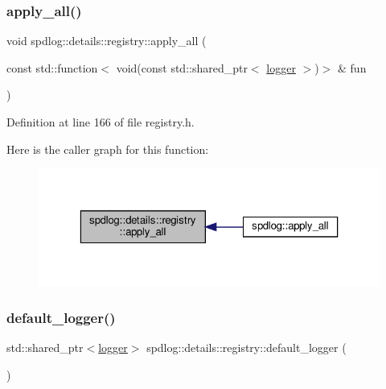 \subsubsection{\texorpdfstring{apply\+\_\+all()}{apply\_all()}}
{\footnotesize\ttfamily void spdlog\+::details\+::registry\+::apply\+\_\+all (\begin{DoxyParamCaption}\item[{const std\+::function$<$ void(const std\+::shared\+\_\+ptr$<$ \hyperlink{classspdlog_1_1logger}{logger} $>$)$>$ \&}]{fun }\end{DoxyParamCaption})\hspace{0.3cm}{\ttfamily [inline]}}



Definition at line 166 of file registry.\+h.

Here is the caller graph for this function\+:
\nopagebreak
\begin{figure}[H]
\begin{center}
\leavevmode
\includegraphics[width=323pt]{classspdlog_1_1details_1_1registry_a781454ea62603cfaebddf14ec2ec9985_icgraph}
\end{center}
\end{figure}
\mbox{\label{classspdlog_1_1details_1_1registry_af6c1f16e0433b6400aef5219fa1b81ea}} 
\subsubsection{\texorpdfstring{default\+\_\+logger()}{default\_logger()}}
{\footnotesize\ttfamily std\+::shared\+\_\+ptr$<$\hyperlink{classspdlog_1_1logger}{logger}$>$ spdlog\+::details\+::registry\+::default\+\_\+logger (\begin{DoxyParamCaption}{ }\end{DoxyParamCaption})\hspace{0.3cm}{\ttfamily [inline]}}



